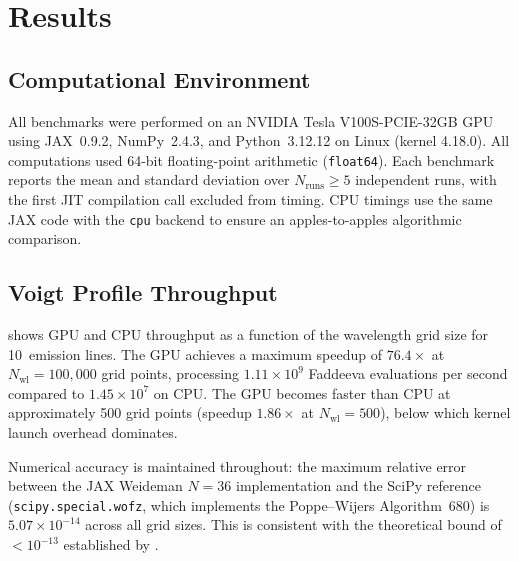 \section{Results}
\label{sec:results}

\subsection{Computational Environment}
\label{sec:environment}

All benchmarks were performed on an NVIDIA Tesla V100S-PCIE-32GB GPU using JAX~0.9.2, NumPy~2.4.3, and Python~3.12.12 on Linux (kernel 4.18.0).
All computations used 64-bit floating-point arithmetic (\texttt{float64}).
Each benchmark reports the mean and standard deviation over $N_\mathrm{runs} \geq 5$ independent runs, with the first JIT compilation call excluded from timing.
CPU timings use the same JAX code with the \texttt{cpu} backend to ensure an apples-to-apples algorithmic comparison.

\subsection{Voigt Profile Throughput}
\label{sec:results-voigt}

 shows GPU and CPU throughput as a function of the wavelength grid size for 10~emission lines.
The GPU achieves a maximum speedup of $76.4\times$ at $N_\mathrm{wl} = 100{,}000$ grid points,
processing $1.11 \times 10^9$ Faddeeva evaluations per second compared to $1.45 \times 10^7$ on CPU.
The GPU becomes faster than CPU at approximately 500 grid points (speedup $1.86\times$ at $N_\mathrm{wl} = 500$),
below which kernel launch overhead dominates.

Numerical accuracy is maintained throughout: the maximum relative error between the JAX Weideman $N = 36$ implementation and the SciPy reference (\texttt{scipy.special.wofz}, which implements the Poppe--Wijers Algorithm~680) is $5.07 \times 10^{-14}$ across all grid sizes.
This is consistent with the theoretical bound of $< 10^{-13}$ established by \citet{Weideman1994}.

